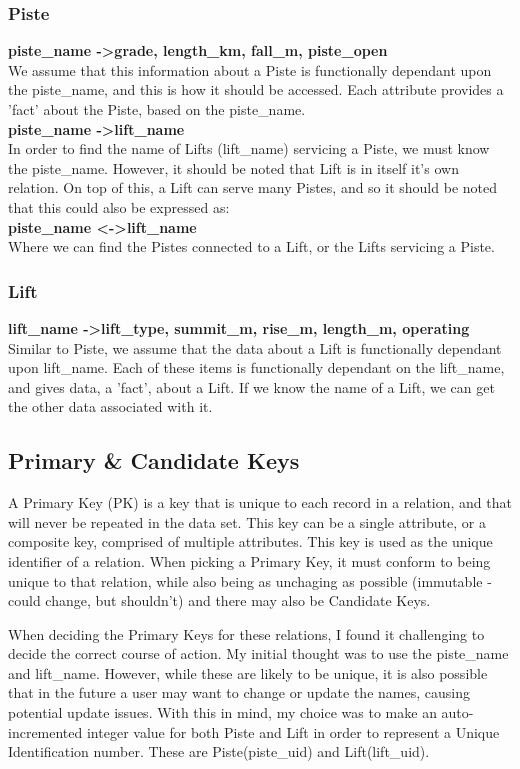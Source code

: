 \documentclass[11pt]{scrartcl} %
\begin{document}
\subsubsection{Piste}
\textbf{piste\_name -\textgreater \space grade, length\_km, fall\_m, piste\_open}
\\[0.1cm]
We assume that this information about a Piste is functionally dependant upon the piste\_name, and this is how it should be accessed. Each attribute provides a 'fact' about the Piste, based on the piste\_name.\\[0.1cm]
\textbf{piste\_name -\textgreater \space lift\_name}
\\[0.1cm]
In order to find the name of Lifts (lift\_name) servicing a Piste, we must know the piste\_name. However, it should be noted that Lift is in itself it's own relation. On top of this, a Lift can serve many Pistes, and so it should be noted that this could also be expressed as:\\[0.1cm]
\textbf{piste\_name \textless -\textgreater \space lift\_name}\\
Where we can find the Pistes connected to a Lift, or the Lifts servicing a Piste.

\subsubsection{Lift}
\textbf{lift\_name -\textgreater \space lift\_type, summit\_m, rise\_m, length\_m, operating}
\\[0.2cm]
Similar to Piste, we assume that the data about a Lift is functionally dependant upon lift\_name. Each of these items is functionally dependant on the lift\_name, and gives data, a 'fact', about a Lift. If we know the name of a Lift, we can get the other data associated with it.

\subsection{Primary \& Candidate Keys}
A Primary Key (PK) is a key that is unique to each record in a relation, and that will never be repeated in the data set. This key can be a single attribute, or a composite key, comprised of multiple attributes. This key is used as the unique identifier of a relation. When picking a Primary Key, it must conform to being unique to that relation, while also being as unchaging as possible (immutable - could change, but shouldn't) and there may also be Candidate Keys.

When deciding the Primary Keys for these relations, I found it challenging to decide the correct course of action. My initial thought was to use the piste\_name and lift\_name. However, while these are likely to be unique, it is also possible that in the future a user may want to change or update the names, causing potential update issues. With this in mind, my choice was to make an auto-incremented integer value for both Piste and Lift in order to represent a Unique Identification number. These are Piste(piste\_uid) and Lift(lift\_uid).
\end{document}
